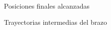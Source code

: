 \begin{frame}{Posiciones finales alcanzadas}
    
\end{frame}

\begin{frame}{Trayectorias intermedias del brazo}
    
\end{frame}
